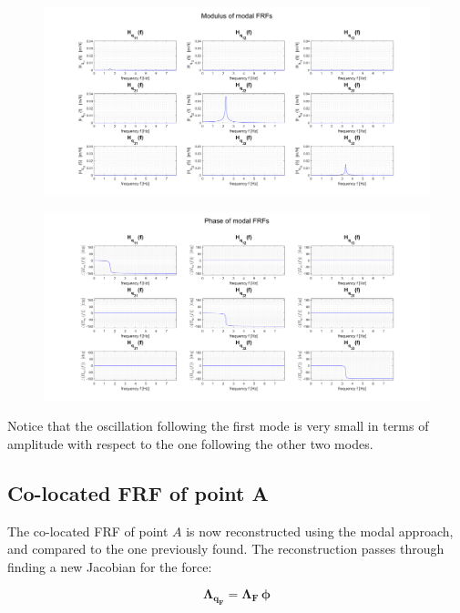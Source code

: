 \documentclass[a4paper,12pt,oneside]{article}
\begin{document}
\begin{figure}[h]
	\hspace{-70pt}
	\includegraphics[scale=0.4]{modal_frfs_modulus}
\end{figure}

\begin{figure}[H]
	\hspace{-70pt}
	\includegraphics[scale=0.4]{modal_frfs_phase}
\end{figure}

Notice that the oscillation following the first mode is very small in terms of amplitude with respect to the one following the other two modes.

\clearpage

\subsection{Co-located FRF of point A}

\vspace{30pt}

The co-located FRF of point $ A $ is now reconstructed using the modal approach, and compared to the one previously found. The reconstruction passes through finding a new Jacobian for the force:

\[
	\mathbf{\Lambda_{q_F}} = \mathbf{\Lambda_F} \, \bm{\phi}
\]
\end{document}
